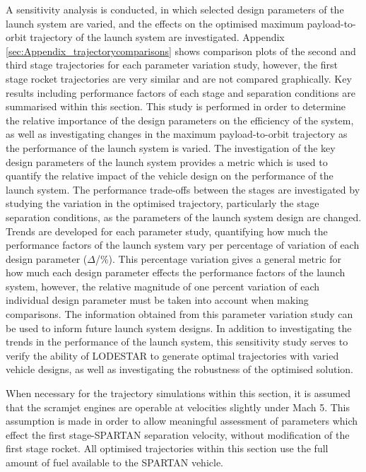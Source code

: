 A sensitivity analysis is conducted, in which selected design parameters of the launch system are varied, and the effects on the optimised maximum payload-to-orbit trajectory of the launch system are investigated. Appendix \ref{sec:Appendix_trajectorycomparisons} shows comparison plots of the second and third stage trajectories for each parameter variation study, however, the first stage rocket trajectories are very similar and are not compared graphically. Key results including performance factors of each stage and separation conditions are summarised within this section.
This study is performed in order to determine the relative importance of the design parameters on the efficiency of the system, as well as investigating changes in the maximum payload-to-orbit trajectory as the performance of the launch system is varied. The investigation of the key design parameters of the launch system provides a metric which is used to quantify the relative impact of the vehicle design on the performance of the launch system. The performance trade-offs between the stages are investigated by studying the variation in the optimised trajectory, particularly the stage separation conditions, as the parameters of the launch system design are changed. 
Trends are developed for each parameter study, quantifying how much the performance factors of the launch system vary per percentage of variation of each design parameter ($\Delta$/\%). This percentage variation gives a general metric for how much each design parameter effects the performance factors of the launch system, however, the relative magnitude of one percent variation of each individual design parameter must be taken into account when making comparisons. 
The information obtained from this parameter variation study can be used to inform future launch system designs. 
In addition to investigating the trends in the performance of the launch system, this sensitivity study serves to verify the ability of LODESTAR to generate optimal trajectories with varied vehicle designs, as well as investigating the robustness of the optimised solution.

When necessary for the trajectory simulations within this section, it is assumed that the scramjet engines are operable at velocities slightly under Mach 5. This assumption is made in order to allow meaningful assessment of parameters which effect the first stage-SPARTAN separation velocity, without modification of the first stage rocket.
All optimised trajectories within this section use the full amount of fuel available to the SPARTAN vehicle. 



